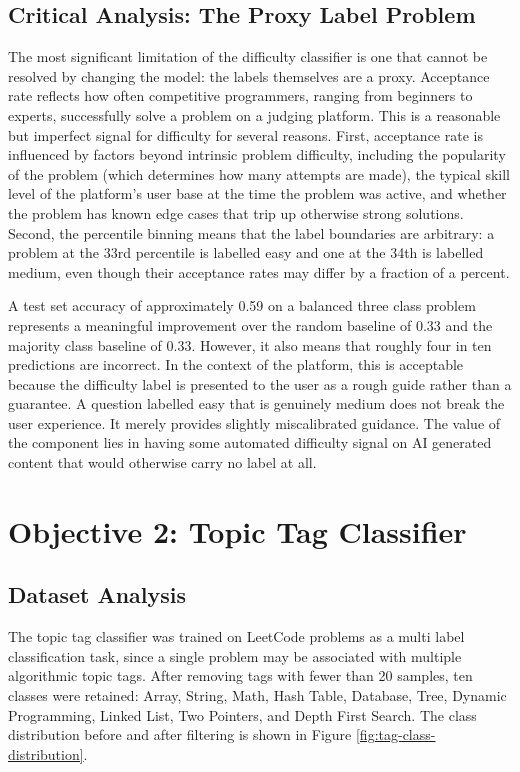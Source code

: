 \subsection{Critical Analysis: The Proxy Label Problem}

The most significant limitation of the difficulty classifier is one
that cannot be resolved by changing the model: the labels themselves
are a proxy. Acceptance rate reflects how often competitive programmers,
ranging from beginners to experts, successfully solve a problem on a
judging platform. This is a reasonable but imperfect signal for
difficulty for several reasons. First, acceptance rate is influenced
by factors beyond intrinsic problem difficulty, including the
popularity of the problem (which determines how many attempts are
made), the typical skill level of the platform's user base at the time
the problem was active, and whether the problem has known edge cases
that trip up otherwise strong solutions. Second, the percentile
binning means that the label boundaries are arbitrary: a problem at
the 33rd percentile is labelled easy and one at the 34th is labelled
medium, even though their acceptance rates may differ by a fraction of
a percent.

A test set accuracy of approximately 0.59 on a balanced three class
problem represents a meaningful improvement over the random baseline
of 0.33 and the majority class baseline of 0.33. However, it also
means that roughly four in ten predictions are incorrect. In the
context of the platform, this is acceptable because the difficulty
label is presented to the user as a rough guide rather than a
guarantee. A question labelled easy that is genuinely medium does not
break the user experience. It merely provides slightly miscalibrated
guidance. The value of the component lies in having some automated
difficulty signal on AI generated content that would otherwise carry
no label at all.

\section{Objective 2: Topic Tag Classifier}
\label{sec:eval-tags}

\subsection{Dataset Analysis}

The topic tag classifier was trained on LeetCode \cite{leetcode2025}
problems as a multi label classification task, since a single problem
may be associated with multiple algorithmic topic tags. After removing
tags with fewer than 20 samples, ten classes were retained: Array,
String, Math, Hash Table, Database, Tree, Dynamic Programming, Linked
List, Two Pointers, and Depth First Search. The class distribution
before and after filtering is shown in Figure
\ref{fig:tag-class-distribution}.

